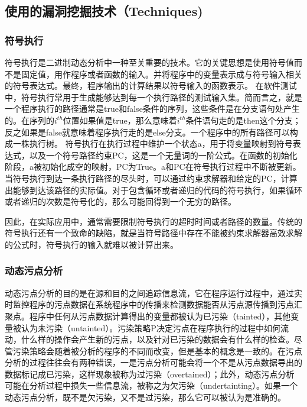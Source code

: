 \documentclass[doctor,privacy,twoside]{buaa_mac}
\begin{document}
\subsection{使用的漏洞挖掘技术（Techniques)}



\subsubsection{符号执行}
符号执行是二进制动态分析中一种至关重要的技术。它的关键思想是使用符号值而不是固定值，用作程序或者函数的输入。并将程序中的变量表示成与符号输入相关的符号表达式。最终，程序输出的计算结果以符号输入的函数表示。
在软件测试中，符号执行常用于生成能够达到每一个执行路径的测试输入集。简而言之，就是一个程序执行的路径通常是true和false条件的序列，这些条件是在分支语句处产生的。在序列的$i^{th}$位置如果值是true，那么意味着$i^{th}$条件语句走的是then这个分支；反之如果是false就意味着程序执行走的是else分支。一个程序中的所有路径可以构成一株执行树。
符号执行在执行过程中维护一个状态a，用于将变量映射到符号表达式，以及一个符号路径约束PC，这是一个无量词的一阶公式。在函数的初始化阶段，a被初始化成空的映射，PC为True。a和PC在符号执行过程中不断被更新。当符号执行到达一条执行路径的尽头时，可以通过约束求解器和给定的PC，计算出能够到达该路径的实际值。对于包含循环或者递归的代码的符号执行，如果循环或者递归的次数是符号化的，那么可能回得到一个无穷的路径。 

因此，在实际应用中，通常需要限制符号执行的超时时间或者路径的数量。传统的符号执行还有一个致命的缺陷，就是当符号路径中存在不能被约束求解器高效求解的公式时，符号执行的输入就难以被计算出来。

\subsubsection{动态污点分析}

动态污点分析的目的是在源和目的之间追踪信息流，它在程序运行过程中，通过实时监控程序的污点数据在系统程序中的传播来检测数据能否从污点源传播到污点汇聚点。程序中任何从污点数据计算得出的变量都被认为已污染（tainted），其他变量被认为未污染（untainted）。污染策略P决定污点在程序执行的过程中如何流动，什么样的操作会产生新的污点，以及针对已污染的数据会有什么样的检查。尽管污染策略会随着被分析的程序的不同而改变，但是基本的概念是一致的。在污点分析的过程往往会有两种错误，一是污点分析可能会将一个不是从污点数据导出的数据标记成已污染，这样现象被称为过污染（overtained）；此外，动态污点分析可能在分析过程中损失一些信息流，被称之为欠污染（undertainting）。如果一个动态污点分析，既不是欠污染，又不是过污染，那么它可以被认为是准确的。
\end{document}

